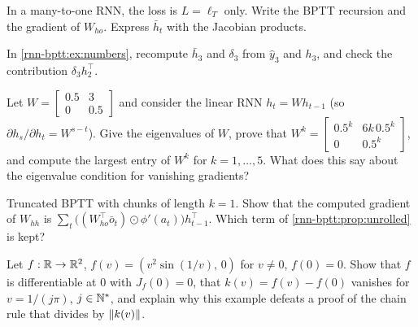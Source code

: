 \begin{notechapter}
\begin{exercise}\label{rnn-bptt:exr:2}
In a many-to-one RNN, the loss is $L = \ell_T$ only. Write the BPTT recursion and the
gradient of $W_{ho}$. Express $\bar h_t$ with the Jacobian products.
\end{exercise}

\begin{exercise}\label{rnn-bptt:exr:3}
In \cref{rnn-bptt:ex:numbers}, recompute $\bar h_3$ and $\delta_3$ from $\hat y_3$ and $h_3$, and check the
contribution $\delta_3h_2^\top$.
\end{exercise}

\begin{exercise}\label{rnn-bptt:exr:nonnormal}
Let $W = \begin{bmatrix}0.5 & 3\\ 0 & 0.5\end{bmatrix}$ and consider the linear RNN $h_t = Wh_{t-1}$ (so $\partial h_s/\partial h_t = W^{s-t}$). Give the
eigenvalues of $W$, prove that $W^k = \begin{bmatrix}0.5^k & 6k\,0.5^k\\ 0 & 0.5^k\end{bmatrix}$, and compute the largest entry of $W^k$ for
$k = 1,\dots,5$. What does this say about the eigenvalue condition for vanishing gradients?
\end{exercise}

\begin{exercise}\label{rnn-bptt:exr:5}
Truncated BPTT with chunks of length $k = 1$. Show that the computed gradient of $W_{hh}$ is
$\sum_t\bigl((W_{ho}^\top\bar o_t)\odot\phi'(a_t)\bigr)h_{t-1}^\top$. Which term of \cref{rnn-bptt:prop:unrolled} is kept?
\end{exercise}

\begin{exercise}\label{rnn-bptt:exr:6}
Let $f:\mathbb{R}\to\mathbb{R}^2$, $f(v) = (v^2\sin(1/v),\,0)$ for $v\neq0$, $f(0) = 0$. Show that $f$ is differentiable at $0$ with $J_f(0) = 0$, that $k(v) = f(v) - f(0)$
vanishes for $v = 1/(j\pi)$, $j\in\mathbb{N}^*$, and explain why this example defeats a proof of the chain rule that
divides by $\left\|k(v)\right\|$.
\end{exercise}
\end{notechapter}
